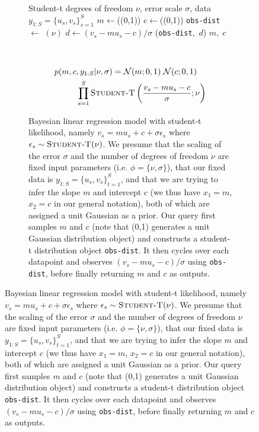 \begin{figure}[p]
	\centering
	\begin{subfigure}[t]{\textwidth}
		\centering	
		\begin{minipage}[t]{0.48\textwidth}
		\begin{algorithmic}[1]
			\renewcommand{\algorithmicrequire}{\textbf{Inputs:}}
			\renewcommand{\algorithmicensure}{\textbf{Outputs:}}			 
			\Require Student-t degrees of freedom $\nu$, error
			scale $\sigma$, data $y_{1:S} = \{u_s,v_s\}_{s=1}^S$
			\State $m\leftarrow$\sample(\normal(0,1))
			\State $c\leftarrow$\sample(\normal(0,1))
			\State \lstinline$obs-dist$\xspace $\leftarrow$ \studentt $(\nu)$
			\State $d \leftarrow (v_s-m u_s - c)/\sigma$
			\State \observe(\lstinline$obs-dist$\xspace,~$d$)
			\EndFor
			\State \Return $m, \; c$
		\end{algorithmic}
		\end{minipage}
		~~
		\begin{minipage}[t]{0.48\textwidth}
			\vfill
			\resizebox{\textwidth}{!}{
				}
			{\small
			\begin{align*}
			p(m,c&, y_{1:S} | \nu, \sigma)= \mathcal{N}(m;0,1) \; \mathcal{N}(c;0,1) \\
										&\prod_{s=1}^{S} \textsc{Student-T} \left(\frac{v_s-mu_s-c}{\sigma} ; \nu \right)
			\end{align*}}
		\end{minipage}
		\caption{Bayesian linear regression model with student-t likelihood, namely
			$v_s = m u_s + c + \sigma \epsilon_s$ where $\epsilon_s \sim \textsc{Student-T}(\nu)$.
			We presume that the scaling of the error $\sigma$ and the number of degrees of freedom $\nu$
			are fixed input parameters (i.e. $\phi=\{\nu,\sigma\}$), that our fixed data is $y_{1:S} = \{u_s,v_s\}_{t=1}^S$,
		 and that we are trying to infer the slope $m$ and intercept $c$ (we thus have $x_1=m$, $x_2=c$ in our
		 general notation), both of which are assigned a unit Gaussian as a prior.  Our query
			first samples $m$ and $c$ (note that \normal(0,1) generates a unit Gaussian distribution object)
			and constructs a student-t distribution object \lstinline$obs-dist$.  It then cycles
		  over each datapoint and observes $(v_s-m u_s -c)/\sigma$ using \lstinline$obs-dist$,
		  before finally returning $m$ and $c$ as outputs.  
}
\end{subfigure}
\end{figure}
